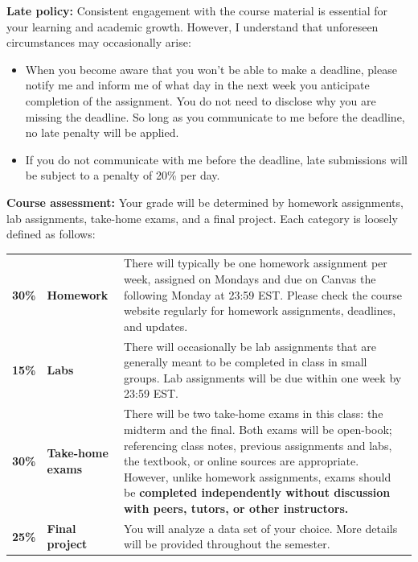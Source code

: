 \documentclass[11pt, a4paper]{article}
\begin{document}
\vspace{4mm}

\noindent \textbf{Late policy:} Consistent engagement with the course
material is essential for your learning and academic growth. However, I
understand that unforeseen circumstances may occasionally arise:

\begin{itemize}
\item When you become aware that you won’t be able to make a deadline, please notify me and inform me of what day in the next week you anticipate completion of the assignment. You do not need to disclose why you are missing the deadline. So long as you communicate to me before the deadline, no late penalty will be applied.
\item If you do not communicate with me before the deadline, late submissions will be subject to a penalty of 20\% per day. 
\end{itemize}

\newpage

\noindent \textbf{Course assessment:} Your grade will be determined by
homework assignments, lab assignments, take-home exams, and a final
project. Each category is loosely defined as follows:

\begin{framed}
\begin{tabular}{p{.5in}p{1.5in}p{4in}}
\textbf{30\%} & \textbf{Homework} & There will typically be one homework assignment per week, assigned on Mondays and due on Canvas the following Monday at 23:59 EST. Please check the course website regularly for homework assignments, deadlines, and updates. \\
\textbf{15\%} & \textbf{Labs} & There will occasionally be lab assignments that are generally meant to be completed in class in small groups. Lab assignments will be due within one week by 23:59 EST. \\
\textbf{30\%} & \textbf{Take-home exams} & There will be two take-home exams in this class: the midterm and the final. Both exams will be open-book; referencing class notes, previous assignments and labs, the textbook, or online sources are appropriate. However, unlike homework assignments, exams should be \textbf{completed independently without discussion with peers, tutors, or other instructors.} \\
\textbf{25\%} & \textbf{Final project} & You will analyze a data set of your choice. More details will be provided throughout the semester. 
\end{tabular}
\end{framed}
\end{document}
